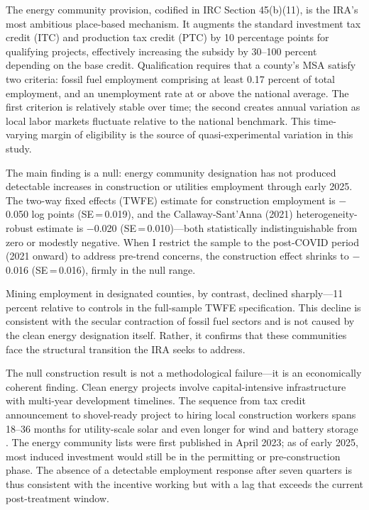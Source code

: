 \documentclass[12pt]{article}
\begin{document}
The energy community provision, codified in IRC Section 45(b)(11), is the IRA's most ambitious place-based mechanism. It augments the standard investment tax credit (ITC) and production tax credit (PTC) by 10 percentage points for qualifying projects, effectively increasing the subsidy by 30--100 percent depending on the base credit. Qualification requires that a county's MSA satisfy two criteria: fossil fuel employment comprising at least 0.17 percent of total employment, and an unemployment rate at or above the national average. The first criterion is relatively stable over time; the second creates annual variation as local labor markets fluctuate relative to the national benchmark. This time-varying margin of eligibility is the source of quasi-experimental variation in this study.

The main finding is a null: energy community designation has not produced detectable increases in construction or utilities employment through early 2025. The two-way fixed effects (TWFE) estimate for construction employment is $-$0.050 log points (SE\,=\,0.019), and the Callaway-Sant'Anna (2021) heterogeneity-robust estimate is $-$0.020 (SE\,=\,0.010)---both statistically indistinguishable from zero or modestly negative. When I restrict the sample to the post-COVID period (2021 onward) to address pre-trend concerns, the construction effect shrinks to $-$0.016 (SE\,=\,0.016), firmly in the null range.

Mining employment in designated counties, by contrast, declined sharply---11 percent relative to controls in the full-sample TWFE specification. This decline is consistent with the secular contraction of fossil fuel sectors and is not caused by the clean energy designation itself. Rather, it confirms that these communities face the structural transition the IRA seeks to address.

The null construction result is not a methodological failure---it is an economically coherent finding. Clean energy projects involve capital-intensive infrastructure with multi-year development timelines. The sequence from tax credit announcement to shovel-ready project to hiring local construction workers spans 18--36 months for utility-scale solar and even longer for wind and battery storage \citep{Bistline2023, DOE2023}. The energy community lists were first published in April 2023; as of early 2025, most induced investment would still be in the permitting or pre-construction phase. The absence of a detectable employment response after seven quarters is thus consistent with the incentive working but with a lag that exceeds the current post-treatment window.
\end{document}
